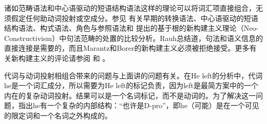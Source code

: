 诸如范畴语法和中心语驱动的短语结构语法这样的理论可以将词汇项直接组合，无须假定任何助动词投射或空成分。参见 有关早期的转换语法、中心语驱动的短语结构语法\indexhpsg、构式语法\indexcxg、角色与参照语法和 \citet{Chomsky2013a}提出的基于根的新构建主义理论（Neo-Constructivism）中句法范畴的处置的比较分析。Rauh总结道，句法和语义信息的直接连接是需要的，而且Marantz和Borer的新构建主义必须被拒绝接受。更多有关新构建主义的评论请参阅 和 。

代词与动词投射相组合带来的问题与上面讲的问题有关。在He left的分析中，代词he是一个词汇成分，所以需要为He left的标记负责，因为left是最简方案中的一个内在的复杂动词投射。结果可以是一个名词标记，而不是动词的。为了解决这一问题，\citet[]{Chomsky2013a}指出he有一个复杂的内部结构：“也许是D-pro”，即he（可能）是在一个可见的限定词和一个名词之外构成的。

